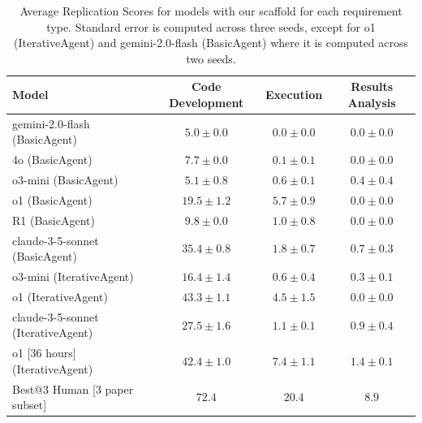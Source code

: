 \documentclass{article}
\theoremstyle{plain}
\theoremstyle{definition}
\theoremstyle{remark}
\begin{document}
\begin{table}[htb]
\caption{Average Replication Scores for models with our scaffold for each requirement type. Standard error is computed across three seeds, except for o1 (IterativeAgent) and gemini-2.0-flash (BasicAgent) where it is computed across two seeds.}
\label{tab:stratified-by-requirement-type}
\vskip 0.15in
\begin{center}
\begin{small}
\begin{sc}
\begin{tabular}{lccc}
\toprule
\textbf{Model} & \textbf{Code Development} & \textbf{Execution} & \textbf{Results Analysis} \\
\midrule
gemini-2.0-flash (BasicAgent) & $5.0 \pm 0.0$ & $0.0 \pm 0.0$ & $0.0 \pm 0.0$ \\
4o (BasicAgent) & $7.7 \pm 0.0$ & $0.1 \pm 0.1$ & $0.0 \pm 0.0$ \\
o3-mini (BasicAgent) & $5.1 \pm 0.8$ & $0.6 \pm 0.1$ & $0.4 \pm 0.4$ \\
o1 (BasicAgent) & $19.5 \pm 1.2$ & $5.7 \pm 0.9$ & $0.0 \pm 0.0$ \\
R1 (BasicAgent) & $9.8 \pm 0.0$ & $1.0 \pm 0.8$ & $0.0 \pm 0.0$ \\
claude-3-5-sonnet (BasicAgent) & $35.4 \pm 0.8$ & $1.8 \pm 0.7$ & $0.7 \pm 0.3$ \\
\midrule
o3-mini (IterativeAgent) & $16.4 \pm 1.4$ & $0.6 \pm 0.4$ & $0.3 \pm 0.1$ \\
o1 (IterativeAgent) & $43.3 \pm 1.1$ & $4.5 \pm 1.5$ & $0.0 \pm 0.0$ \\
claude-3-5-sonnet (IterativeAgent) & $27.5 \pm 1.6$ & $1.1 \pm 0.1$ & $0.9 \pm 0.4$ \\
\midrule
o1 [36 hours] (IterativeAgent) & $42.4 \pm 1.0$ & $7.4 \pm 1.1$ & $1.4 \pm 0.1$ \\
\midrule
Best@3 Human [3 paper subset] & $72.4$ & $20.4$ & $8.9$ \\
\bottomrule
\end{tabular}
\end{sc}
\end{small}
\end{center}
\vskip -0.1in
\end{table}


\end{document}
